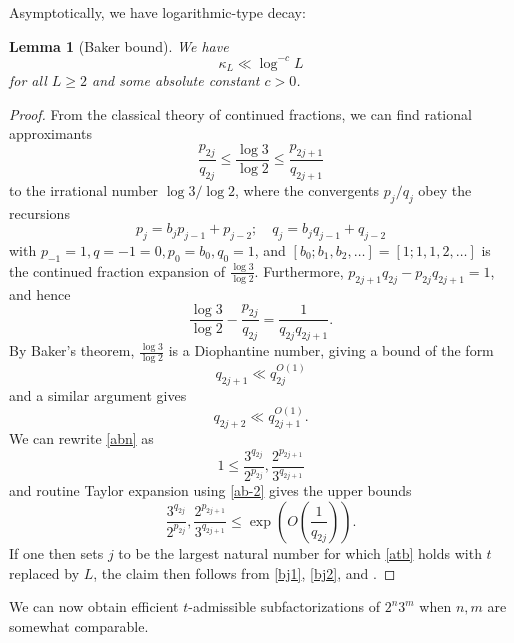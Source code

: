 \documentclass[12pt,a4paper,reqno]{amsart}
\numberwithin{equation}{section}
\theoremstyle{plain}
\newtheorem{lemma}[theorem]{Lemma}
\theoremstyle{definition}
\begin{document}
Asymptotically, we have logarithmic-type decay:

\begin{lemma}[Baker bound]\label{baker} We have
  $$ \kappa_L \ll \log^{-c} L$$
for all $L \geq 2$ and some absolute constant $c>0$.
\end{lemma}

\begin{proof}  From the classical theory of continued fractions, we can find rational approximants
\begin{equation}\label{abn}
 \frac{p_{2j}}{q_{2j}} \leq \frac{\log 3}{\log 2} \leq \frac{p_{2j+1}}{q_{2j+1}}
\end{equation}
to the irrational number $\log 3/\log 2$, where the convergents $p_j/q_j$ obey the recursions
$$ p_j = b_j p_{j-1} + p_{j-2}; \quad q_j = b_j q_{j-1} + q_{j-2}$$
with $p_{-1} = 1, q={-1}=0, p_0 = b_0, q_0=1$, and $[b_0;b_1,b_2,\dots] = [1;1,1,2,\dots]$ is the continued fraction expansion of $\frac{\log 3}{\log 2}$.  Furthermore, $p_{2j+1}q_{2j} - p_{2j} q_{2j+1} = 1$, and hence
\begin{equation}\label{abn-2} 
  \frac{\log 3}{\log 2} - \frac{p_{2j}}{q_{2j}} = \frac{1}{q_{2j} q_{2j+1}}.
\end{equation}
By Baker's theorem, $\frac{\log 3}{\log 2}$ is a Diophantine number, giving a bound of the form
\begin{equation}\label{bj1}
   q_{2j+1} \ll q_{2j}^{O(1)}
\end{equation}
and a similar argument gives
\begin{equation}\label{bj2}
 q_{2j+2} \ll q_{2j+1}^{O(1)}.
\end{equation}
We can rewrite \eqref{abn} as
$$ 1 \leq \frac{3^{q_{2j}}}{2^{p_{2j}}}, \frac{2^{p_{2j+1}}}{3^{q_{2j+1}}}$$
and routine Taylor expansion using \eqref{ab-2} gives the upper bounds
$$ \frac{3^{q_{2j}}}{2^{p_{2j}}}, \frac{2^{p_{2j+1}}}{3^{q_{2j+1}}}\leq \exp\left( O\left( \frac{1}{q_{2j}}\right)\right).$$
If one then sets $j$ to be the largest natural number for which \eqref{atb} holds with $t$ replaced by $L$, the claim then follows from \eqref{bj1}, \eqref{bj2}, and .
\end{proof}


We can now obtain efficient $t$-admissible subfactorizations of $2^n 3^m$ when $n,m$ are somewhat comparable.
\end{document}

